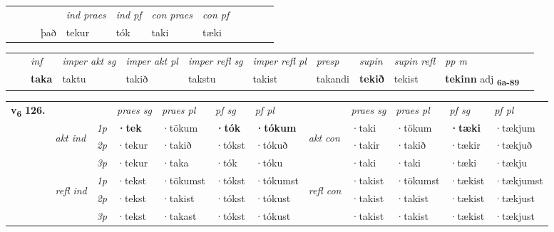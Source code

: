 \begin{tabular}{llllllllllll}
 & &  & &  \textit{ind praes} & \textit{ind pf} & \textit{con praes} & \textit{con pf} \\*
&  & & það & tekur & tók & taki & tæki \\*
\cmidrule{5-9}
\end{tabular}


\begin{tabular}{llllllllllll}
 & & \textit{inf} & \textit{imper akt sg} & \textit{imper akt pl} & \textit{imper refl sg} & \textit{imper refl pl} & \textit{presp} & \textit{supin} & \textit{supin refl} & \textit{pp m}     \\*
  & & \textbf{taka} & taktu  & takið & takstu & takist & takandi &  \textbf{tekið} & tekist & \textbf{tekinn} adj \textbf{\textsubscript{6a-89}} \\*
\cmidrule{1-12}
\end{tabular}



\begin{tabular}{llllllllllll} \toprule
\multirow{4}{*}{{{\textbf{v{\textsubscript{6}}} \Large{\textbf{126.}}}}}  & &   &  \textit{praes sg}  & \textit{praes pl}  &\textit{ pf sg} & \textit{pf pl} &  &  \textit{praes sg}  & \textit{praes pl}  & \textit{pf sg} & \textit{pf pl } \\*
	\cmidrule{4-7} \cmidrule{9-12}
 & \multirow{3}{*}{\begin{turn}{90}\textit{akt ind}\end{turn}} & {\textit{1p}} & \textbf{·tek} & ·tökum    & \textbf{·tók} & \textbf{·tókum} & \multirow{3}{*}{\begin{turn}{90}\textit{akt con}\end{turn}} &·taki & ·tökum & \textbf{·tæki} & ·tækjum\\*
& &  {\textit{2p}} &  ·tekur  & ·takið   & ·tókst & ·tókuð & & ·takir & ·takið & ·tækir & ·tækjuð \\*
& &  {\textit{3p}} & ·tekur & ·taka   & ·tók & ·tóku & & ·taki & ·taki& ·tæki & ·tækju  \\*
\cmidrule{4-7} \cmidrule{9-12}
 &\multirow{3}{*}{\begin{turn}{90}\textit{refl ind}\end{turn}} & {\textit{1p}} & ·tekst & ·tökumst    & ·tókst & ·tókumst & \multirow{3}{*}{\begin{turn}{90}\textit{refl con}\end{turn}}  &·takist & ·tökumst & ·tækist & ·tækjumst\\*
 &&  {\textit{2p}} &  ·tekst  & ·takist   & ·tókst & ·tókust & &·takist & ·takist & ·tækist & ·tækjust \\*
& &  {\textit{3p}} & ·tekst & ·takast   & ·tókst & ·tókust & & ·takist & ·takist& ·tækist & ·tækjust  \\*
\cmidrule{4-7} \cmidrule{9-12}
\end{tabular}


